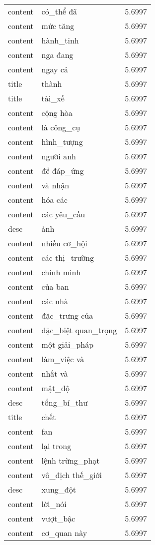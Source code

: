 \documentclass{article}
\begin{document}
\begin{tabular}{lll}
content & có\_thể đã & 5.6997\\
content & mức tăng & 5.6997\\
content & hành\_tinh & 5.6997\\
content & nga đang & 5.6997\\
content & ngay cả & 5.6997\\
title & thành & 5.6997\\
title & tài\_xế & 5.6997\\
content & cộng hòa & 5.6997\\
content & là công\_cụ & 5.6997\\
content & hình\_tượng & 5.6997\\
content & người anh & 5.6997\\
content & để đáp\_ứng & 5.6997\\
content & và nhận & 5.6997\\
content & hóa các & 5.6997\\
content & các yêu\_cầu & 5.6997\\
desc & ảnh & 5.6997\\
content & nhiều cơ\_hội & 5.6997\\
content & các thị\_trường & 5.6997\\
content & chính mình & 5.6997\\
content & của ban & 5.6997\\
content & các nhà & 5.6997\\
content & đặc\_trưng của & 5.6997\\
content & đặc\_biệt quan\_trọng & 5.6997\\
content & một giải\_pháp & 5.6997\\
content & làm\_việc và & 5.6997\\
content & nhất và & 5.6997\\
content & mật\_độ & 5.6997\\
desc & tổng\_bí\_thư & 5.6997\\
title & chết & 5.6997\\
content & fan & 5.6997\\
content & lại trong & 5.6997\\
content & lệnh trừng\_phạt & 5.6997\\
content & vô\_địch thế\_giới & 5.6997\\
desc & xung\_đột & 5.6997\\
content & lời\_nói & 5.6997\\
content & vượt\_bậc & 5.6997\\
content & cơ\_quan này & 5.6997\\

\end{tabular}
\end{document}
